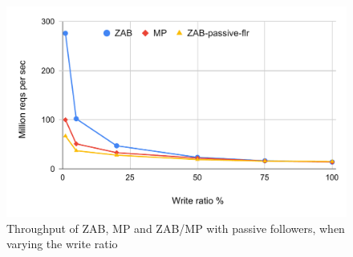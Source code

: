\begin{figure}[t]
  \centering
  \includegraphics[scale=0.4]{1_figures/zab-passive-flr.pdf}
  \caption{Throughput of ZAB, MP and ZAB/MP with passive followers, when varying the write ratio}
  \label{fig:zab-psv}
\end{figure}